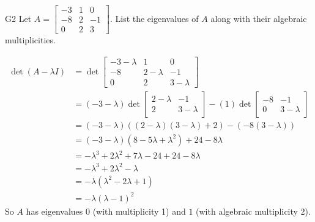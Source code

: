 \documentclass{sbgLAquiz}
\begin{document}
\begin{problem}{G2}
Let $A= \begin{bmatrix}-3 & 1 & 0 \\ -8 & 2 & -1 \\ 0 & 2 & 3\end{bmatrix}$.
List the eigenvalues of $A$ along with their algebraic multiplicities.
\end{problem}
\begin{solution}

\begin{align*}
\det(A-\lambda I) &= \det \begin{bmatrix} -3-\lambda & 1 & 0 \\ -8 & 2-\lambda & -1 \\ 0 & 2 & 3-\lambda \end{bmatrix} \\
&=(-3-\lambda) \det \begin{bmatrix} 2-\lambda & -1 \\ 2 & 3-\lambda \end{bmatrix} -(1) \det \begin{bmatrix} -8 & -1 \\ 0 & 3-\lambda \end{bmatrix} \\
&=(-3-\lambda)\left( (2-\lambda)(3-\lambda)+2 \right)-\left(-8(3-\lambda) \right) \\
&=(-3-\lambda)(8-5\lambda+\lambda ^2) +24-8\lambda \\
&=-\lambda ^3 +2\lambda ^2+7\lambda -24 +24-8\lambda \\
&= -\lambda ^3+2\lambda ^2 - \lambda \\
&= -\lambda (\lambda ^2-2\lambda +1 ) \\
&= -\lambda(\lambda-1)^2
\end{align*}
So $A$ has eigenvalues $0$ (with multiplicity 1) and $1$ (with algebraic multiplicity 2).
\end{solution}
\end{document}
